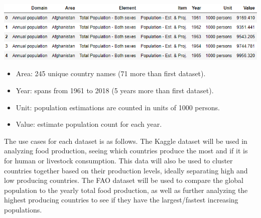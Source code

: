 \documentclass[12pt, a4paper]{article}
\begin{document}
\begin{spacing}{1.1}
	\begin{center}	\includegraphics[scale=.8]{pop_data}	\end{center}


	\begin{itemize}
		\item Area: 245 unique country names (71 more than first dataset).
		\item Year: spans from 1961 to 2018 (5 years more than first dataset).
		\item Unit: population estimations are counted in units of 1000 persons.
		\item Value: estimate population count for each year.
	\end{itemize}\vspace*{2mm}
	The use cases for each dataset is as follows. The Kaggle dataset will be used in analyzing food production, seeing which countries produce the most and if it is for human or livestock consumption. This data will also be used to cluster countries together based on their production levels, ideally separating high and low producing countries. The FAO dataset will be used to compare the global population to the yearly total food production, as well as further analyzing the highest producing countries to see if they have the largest/fastest increasing populations.	
	

\end{spacing}
\end{document}
